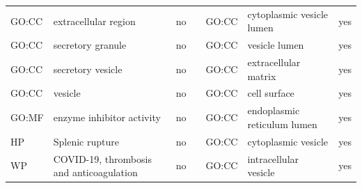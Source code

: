 \begin{longtable}{@{}lp{4cm}lllp{4cm}l@{}}
GO:CC           & extracellular region                                                                                                               & no               &           & GO:CC           & cytoplasmic vesicle lumen                                                                                                                                              & yes              \\
GO:CC           & secretory granule                                                                                                                  & no               &           & GO:CC           & vesicle lumen                                                                                                                                                          & yes              \\
GO:CC           & secretory vesicle                                                                                                                  & no               &           & GO:CC           & extracellular matrix                                                                                                                                                   & yes              \\
GO:CC           & vesicle                                                                                                                            & no               &           & GO:CC           & cell surface                                                                                                                                                           & yes              \\
GO:MF           & enzyme inhibitor activity                                                                                                          & no               &           & GO:CC           & endoplasmic reticulum lumen                                                                                                                                            & yes              \\
HP              & Splenic rupture                                                                                                                    & no               &           & GO:CC           & cytoplasmic vesicle                                                                                                                                                    & yes              \\
WP              & COVID-19, thrombosis and anticoagulation                                                                                           & no               &           & GO:CC           & intracellular vesicle                                                                                                                                                  & yes              \\

\end{longtable}
